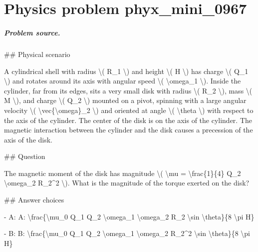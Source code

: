 
\chapter{Physics problem phyx\_mini\_0967}
\label{ch:PhyXMiniProblems_problem_phyx_mini_0967}

\paragraph{Problem source.}
\#\# Physical scenario

A cylindrical shell with radius \textbackslash{}( R\_1 \textbackslash{}) and height \textbackslash{}( H \textbackslash{}) has charge \textbackslash{}( Q\_1 \textbackslash{}) and rotates around its axis with angular speed \textbackslash{}( \textbackslash{}omega\_1 \textbackslash{}). Inside the cylinder, far from its edges, sits a very small disk with radius \textbackslash{}( R\_2 \textbackslash{}), mass \textbackslash{}( M \textbackslash{}), and charge \textbackslash{}( Q\_2 \textbackslash{}) mounted on a pivot, spinning with a large angular velocity \textbackslash{}( \textbackslash{}vec\{\textbackslash{}omega\}\_2 \textbackslash{}) and oriented at angle \textbackslash{}( \textbackslash{}theta \textbackslash{}) with respect to the axis of the cylinder. The center of the disk is on the axis of the cylinder. The magnetic interaction between the cylinder and the disk causes a precession of the axis of the disk.

\#\# Question

The magnetic moment of the disk has magnitude \textbackslash{}( \textbackslash{}mu = \textbackslash{}frac\{1\}\{4\} Q\_2 \textbackslash{}omega\_2 R\_2\textasciicircum{}2 \textbackslash{}). What is the magnitude of the torque exerted on the disk?

\#\# Answer choices

- A: A: \textbackslash{}frac\{\textbackslash{}mu\_0 Q\_1 Q\_2 \textbackslash{}omega\_1 \textbackslash{}omega\_2 R\_2 \textbackslash{}sin \textbackslash{}theta\}\{8 \textbackslash{}pi H\}

- B: B: \textbackslash{}frac\{\textbackslash{}mu\_0 Q\_1 Q\_2 \textbackslash{}omega\_1 \textbackslash{}omega\_2 R\_2\textasciicircum{}2 \textbackslash{}sin \textbackslash{}theta\}\{8 \textbackslash{}pi H\}

